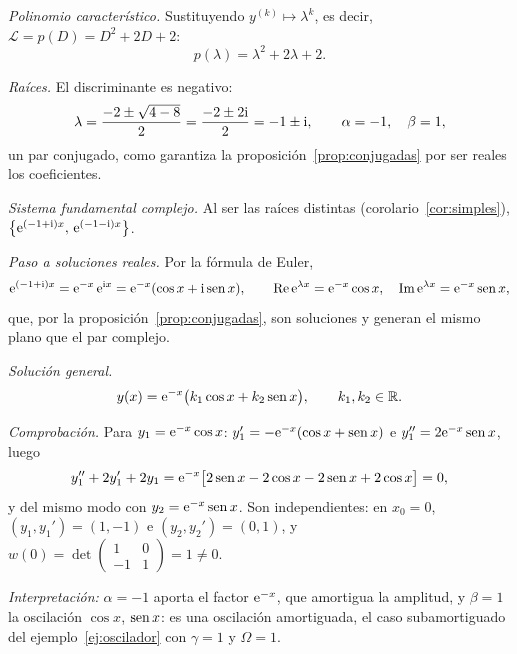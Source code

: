 \documentclass[11pt,twoside]{article}
\newcommand\Lop{\mathcal L}
\newcommand\smat[1]{\left(\begin{smallmatrix}#1\end{smallmatrix}\right)}
\begin{document}
\begin{ejemplo}[$y''+2y'+2y=0$ \cite{usal}]\label{ej:amort}
\begin{pasos}
\item \emph{Polinomio característico.} Sustituyendo $y^{(k)}\mapsto\lambda^k$, es decir, $\Lop=p(D)=D^2+2D+2$:
\begin{equation*}
p(\lambda)=\lambda^2+2\lambda+2.
\end{equation*}
\item \emph{Raíces.} El discriminante es negativo:
\begin{equation*}
\lambda=\frac{-2\pm\sqrt{4-8}}{2}=\frac{-2\pm2\mathrm{i}}{2}=-1\pm\mathrm{i},\qquad\alpha=-1,\quad\beta=1,
\end{equation*}
un par conjugado, como garantiza la proposición~\ref{prop:conjugadas} por ser reales los coeficientes.
\item \emph{Sistema fundamental complejo.} Al ser las raíces distintas (corolario~\ref{cor:simples}),
$\big\{\mathrm{e}^{(-1+\mathrm{i})x},\,\mathrm{e}^{(-1-\mathrm{i})x}\big\}$.
\item \emph{Paso a soluciones reales.} Por la fórmula de Euler,
\begin{equation*}
\mathrm{e}^{(-1+\mathrm{i})x}=\mathrm{e}^{-x}\,\mathrm{e}^{\mathrm{i} x}=\mathrm{e}^{-x}(\cos x+\mathrm{i}\operatorname{sen} x),\qquad\operatorname{Re}\mathrm{e}^{\lambda x}=\mathrm{e}^{-x}\cos x,\quad\operatorname{Im}\mathrm{e}^{\lambda x}=\mathrm{e}^{-x}\operatorname{sen} x,
\end{equation*}
que, por la proposición~\ref{prop:conjugadas}, son soluciones y generan el mismo plano que el par complejo.
\item \emph{Solución general.}
\begin{equation}\label{eq:ejamort}
y(x)=\mathrm{e}^{-x}\big(k_1\cos x+k_2\operatorname{sen} x\big),\qquad k_1,k_2\in\mathbb{R}.
\end{equation}
\item \emph{Comprobación.} Para $y_1=\mathrm{e}^{-x}\cos x$: $y_1'=-\mathrm{e}^{-x}(\cos x+\operatorname{sen} x)$ e $y_1''=2\mathrm{e}^{-x}\operatorname{sen} x$, luego
\begin{equation*}
y_1''+2y_1'+2y_1=\mathrm{e}^{-x}\big[2\operatorname{sen} x-2\cos x-2\operatorname{sen} x+2\cos x\big]=0,
\end{equation*}
y del mismo modo con $y_2=\mathrm{e}^{-x}\operatorname{sen} x$. Son independientes: en $x_0=0$, $(y_1,y_1')=(1,-1)$ e $(y_2,y_2')=(0,1)$, y
$w(0)=\det\smat{1&0\\-1&1}=1\neq0$.
\end{pasos}
\emph{Interpretación:} $\alpha=-1$ aporta el factor $\mathrm{e}^{-x}$, que amortigua la amplitud, y $\beta=1$ la oscilación $\cos x$,
$\operatorname{sen} x$: es una oscilación amortiguada, el caso subamortiguado del ejemplo~\ref{ej:oscilador} con $\gamma=1$ y $\Omega=1$.
\end{ejemplo}
\end{document}
